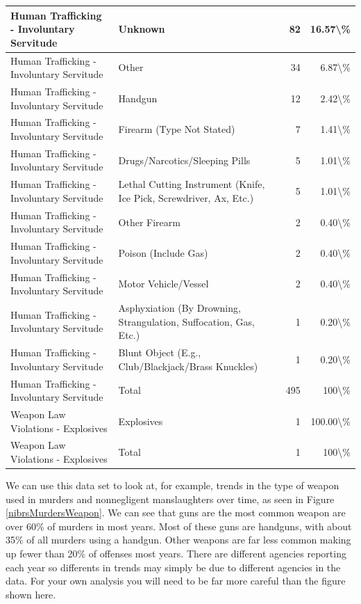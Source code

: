 \documentclass[
]{krantz}
\begin{document}
\begin{longtable}[t]{l|l|r|r}
\hline
Human Trafficking - Involuntary Servitude & Unknown & 82 & 16.57\textbackslash{}\%\\
\hline
Human Trafficking - Involuntary Servitude & Other & 34 & 6.87\textbackslash{}\%\\
\hline
Human Trafficking - Involuntary Servitude & Handgun & 12 & 2.42\textbackslash{}\%\\
\hline
Human Trafficking - Involuntary Servitude & Firearm (Type Not Stated) & 7 & 1.41\textbackslash{}\%\\
\hline
Human Trafficking - Involuntary Servitude & Drugs/Narcotics/Sleeping Pills & 5 & 1.01\textbackslash{}\%\\
\hline
Human Trafficking - Involuntary Servitude & Lethal Cutting Instrument (Knife, Ice Pick, Screwdriver, Ax, Etc.) & 5 & 1.01\textbackslash{}\%\\
\hline
Human Trafficking - Involuntary Servitude & Other Firearm & 2 & 0.40\textbackslash{}\%\\
\hline
Human Trafficking - Involuntary Servitude & Poison (Include Gas) & 2 & 0.40\textbackslash{}\%\\
\hline
Human Trafficking - Involuntary Servitude & Motor Vehicle/Vessel & 2 & 0.40\textbackslash{}\%\\
\hline
Human Trafficking - Involuntary Servitude & Asphyxiation (By Drowning, Strangulation, Suffocation, Gas, Etc.) & 1 & 0.20\textbackslash{}\%\\
\hline
Human Trafficking - Involuntary Servitude & Blunt Object (E.g., Club/Blackjack/Brass Knuckles) & 1 & 0.20\textbackslash{}\%\\
\hline
Human Trafficking - Involuntary Servitude & Total & 495 & 100\textbackslash{}\%\\
\hline
Weapon Law Violations - Explosives & Explosives & 1 & 100.00\textbackslash{}\%\\
\hline
Weapon Law Violations - Explosives & Total & 1 & 100\textbackslash{}\%\\
\hline
\end{longtable}

We can use this data set to look at, for example, trends in
the type of weapon used in murders and nonnegligent
manslaughters over time, as seen in Figure
\ref{nibrsMurdersWeapon}. We can see that guns are the most
common weapon are over 60\% of murders in most years. Most
of these guns are handguns, with about 35\% of all murders
using a handgun. Other weapons are far less common making up
fewer than 20\% of offenses most years. There are different
agencies reporting each year so differents in trends may
simply be due to different agencies in the data. For your
own analysis you will need to be far more careful than the
figure shown here.
\end{document}
